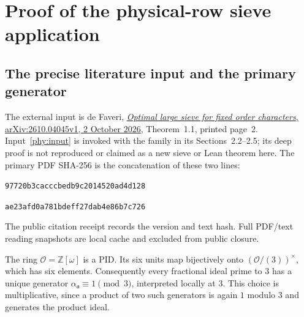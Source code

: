 \documentclass[11pt]{article}
\theoremstyle{definition}\newtheorem{definition}[theorem]{Definition}
\theoremstyle{remark}\newtheorem{remark}[theorem]{Remark}
\begin{document}
\section{Proof of the physical-row sieve application}\label{phy:details}
\subsection{The precise literature input and the primary generator}
The external input is de Faveri,
\href{https://arxiv.org/abs/2610.04045v1}{\emph{Optimal large sieve for
fixed order characters}, arXiv:2610.04045v1, 2 October 2026},
Theorem~1.1, printed page~2. Input~\eqref{phy:input} is invoked with
the family in its Sections~2.2--2.5; its deep proof is not reproduced
or claimed as a new sieve or Lean theorem here. The primary PDF SHA-256 is the concatenation of these two lines:
\par\noindent\texttt{97720b3cacccbedb9c2014520ad4d128}\par
\noindent\texttt{ae23afd0a781bdeff27dab4e86b7c726}\par
The public citation receipt records the version and text hash. Full
PDF/text reading snapshots are local cache and excluded from public closure.

The ring $\mathcal O=\mathbb Z[\omega]$ is a PID. Its six units map
bijectively onto $(\mathcal O/(3))^\times$, which has six elements.
Consequently every fractional ideal prime to $3$ has a unique generator
$\alpha_{\mathfrak a}\equiv1\pmod3$, interpreted locally at $3$.
This choice is multiplicative, since a product of two such generators
is again $1$ modulo $3$ and generates the product ideal.
\end{document}

